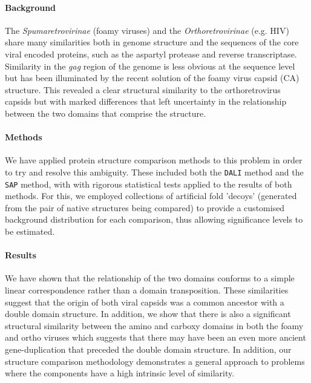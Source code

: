 \paragraph{Background}
The {\em Spumaretrovirinae} (foamy viruses) and the {\em Orthoretrovirinae} (e.g. HIV) share
many similarities both in genome structure and the sequences of the core viral encoded proteins,
such as the aspartyl protease and reverse transcriptase.  Similarity in the {\em gag} region of the
genome is less obvious at the sequence level but has been illuminated by the recent solution of
the foamy virus capsid (CA) structure.   This revealed a clear structural similarity to the
orthoretrovirus capsids but with marked differences that left uncertainty in the relationship
between the two domains that comprise the structure.

\paragraph{Methods}
We have applied protein structure comparison methods to this problem in order to try and
resolve this ambiguity.  These included both the {\tt DALI} method and the {\tt SAP} method,
with with rigorous statistical tests applied to the results of both methods.  For this,
we employed collections of artificial fold 'decoys' (generated from the pair of native 
structures being compared) to provide a customised background distribution for each
comparison, thus allowing significance levels to be estimated.

\paragraph{Results}
We have shown that the relationship of the two domains
conforms to a simple linear correspondence rather than a domain transposition.   These
similarities suggest that the origin of both viral capsids was a common ancestor with a double
domain structure.  In addition, we show that there is also a significant structural similarity
between the amino and carboxy domains in both the foamy and ortho viruses which suggests that
there may have been an even more ancient gene-duplication that preceded the double domain structure.
In addition, our structure comparison methodology demonstrates a general approach to problems
where the components have a high intrinsic level of similarity.
